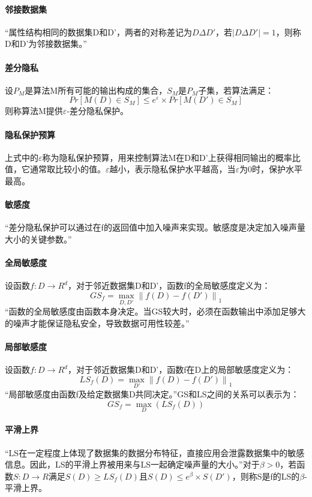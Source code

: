 \documentclass[12pt,a4paper]{article}
\begin{document}
\paragraph{邻接数据集} “属性结构相同的数据集D和D'，两者的对称差记为$D\Delta D'$，若$|D\Delta D'|=1$，则称D和D'为邻接数据集。”
\paragraph{差分隐私} 设$P_M$是算法M所有可能的输出构成的集合，$S_M$是$P_M$子集，若算法满足：
\begin{equation}
	Pr[M(D)\in S_M] \leq e^\varepsilon \times Pr[M(D')\in S_M]
\end{equation}
则称算法M提供$\varepsilon$-差分隐私保护。
\paragraph{隐私保护预算} 上式中的$\varepsilon$称为隐私保护预算，用来控制算法M在D和D'上获得相同输出的概率比值，它通常取比较小的值。$\varepsilon$越小，表示隐私保护水平越高，当$\varepsilon$为0时，保护水平最高。
\paragraph{敏感度} “差分隐私保护可以通过在f的返回值中加入噪声来实现。敏感度是决定加入噪声量大小的关键参数。”
\paragraph{全局敏感度} 设函数$f:D\rightarrow R^d$，对于邻近数据集D和D'，函数f的全局敏感度定义为：
\begin{equation}
	GS_f=\max_{D,D'} \left \| f(D)-f(D') \right \|_1
\end{equation}
“函数的全局敏感度由函数本身决定。当GS较大时，必须在函数输出中添加足够大的噪声才能保证隐私安全，导致数据可用性较差。”
\paragraph{局部敏感度} 设函数$f:D\rightarrow R^d$，对于邻近数据集D和D'，函数f在D上的局部敏感度定义为：
\begin{equation}
	LS_f(D) = \max_{D'} \left \| f(D)-f(D') \right \|_1
\end{equation}
“局部敏感度由函数f及给定数据集D共同决定。”GS和LS之间的关系可以表示为：
\begin{equation}
	GS_f=\max_D(LS_f(D))
\end{equation}
\paragraph{平滑上界} “LS在一定程度上体现了数据集的数据分布特征，直接应用会泄露数据集中的敏感信息。因此，LS的平滑上界被用来与LS一起确定噪声量的大小。”对于$\beta>0$，若函数$S:D\rightarrow R$满足$S(D) \geq LS_f(D)$且$S(D) \leq e^\beta \times S(D')$，则称S是f的LS的$\beta$-平滑上界。
\end{document}
